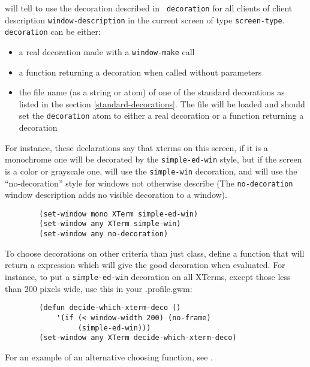 \begin{description}

\label{set-window} will tell {\GWM} to use the decoration described in {\tt
decoration} for all clients of client description {\tt window-description} in the
current screen of type \verb"screen-type". {\tt decoration} can be either:

\begin{itemize} 
\item a real decoration made with a {\tt window-make} call
\item a function returning a decoration when called without parameters 
\item the file name (as a string or atom) of one of the standard decorations 
as listed in the section \ref{standard-decorations}. The file will be loaded
and should set the {\tt decoration} atom to either a real decoration or a
function returning a decoration 
\end{itemize}

For instance, these declarations say that xterms on this screen, if it is a
monochrome one will be decorated by the \verb"simple-ed-win" style, but if
the screen is a color or grayscale one, will use the \verb"simple-win"
decoration, and will use the ``no-decoration'' style for windows not otherwise
describe (The {\tt no-decoration} window description adds no visible
decoration to a window).

{\exemplefont\begin{verbatim}
        (set-window mono XTerm simple-ed-win)
        (set-window any XTerm simple-win)
        (set-window any no-decoration)
\end{verbatim}}

To choose decorations on other criteria than just class, define a function
that will return a {\WOOL} expression which will give the good decoration when
evaluated. For instance, to put a \verb"simple-ed-win" decoration on all
XTerms, except those less than 200 pixels wide, use this in your .profile.gwm:

{\exemplefont\begin{verbatim}
        (defun decide-which-xterm-deco ()
            '(if (< window-width 200) (no-frame)
                 (simple-ed-win)))
        (set-window any XTerm decide-which-xterm-deco)
\end{verbatim}}

For an example of an alternative choosing function, see
.


\end{description}
